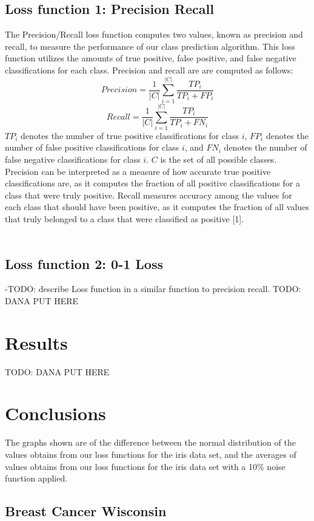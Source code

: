 \documentclass[twoside,11pt]{article}
\begin{document}
\subsection{Loss function 1: Precision Recall}
The Precision/Recall loss function computes two values, known as precision and recall, to measure the performance of our class prediction algorithm. This loss function utilizes the amounts of true positive, false positive, and false negative classifications for each class. Precision and recall are are computed as follows: 
$$Precision = \frac{1}{|C|} \sum^{|C|}_{i=1} \frac{TP_i}{TP_i + FP_i}$$
$$Recall = \frac{1}{|C|} \sum^{|C|}_{i=1} \frac{TP_i}{TP_i + FN_i}$$
$TP_i$ denotes the number of true positive classifications for class $i$, $FP_i$ denotes the number of false positive classifications for class $i$, and $FN_i$ denotes the number of false negative classifications for class $i$. $C$ is the set of all possible classes. Precision can be interpreted as a measure of how accurate true positive classifications are, as it computes the fraction of all positive classifications for a class that were truly positive. Recall measures accuracy among the values for each class that should have been positive, as it computes the fraction of all values that truly belonged to a class that were classified as positive [1]. \\ \\

\subsection{Loss function 2: 0-1 Loss}
-TODO: describe Loss function in a similar function to precision recall.
TODO: DANA PUT HERE

\section{Results}
TODO: DANA PUT HERE

\section{Conclusions}

The graphs shown are of the difference between the normal distribution of the values obtains from our loss functions for the iris data set, and the averages of values obtains from our loss functions for the iris data set with a 10\% noise function applied. 

\subsection{Breast Cancer Wisconsin}
\end{document}
